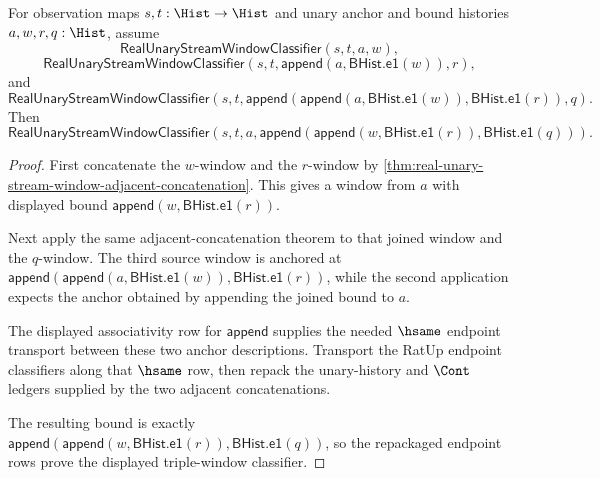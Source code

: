 \begin{theorem}
\label{thm:real-unary-window-associative-triple-concatenation}
For observation maps $s,t:\Hist\to\Hist$ and unary anchor and bound histories
$a,w,r,q:\Hist$, assume
$$
\mathsf{RealUnaryStreamWindowClassifier}(s,t,a,w),
$$
$$
\mathsf{RealUnaryStreamWindowClassifier}
(s,t,\mathsf{append}(a,\mathsf{BHist.e1}(w)),r),
$$
and
$$
\mathsf{RealUnaryStreamWindowClassifier}
(s,t,\mathsf{append}(\mathsf{append}(a,\mathsf{BHist.e1}(w)),
\mathsf{BHist.e1}(r)),q).
$$
Then
$$
\mathsf{RealUnaryStreamWindowClassifier}
(s,t,a,\mathsf{append}(\mathsf{append}(w,\mathsf{BHist.e1}(r)),
\mathsf{BHist.e1}(q))).
$$
\end{theorem}
\begin{proof}
First concatenate the $w$-window and the $r$-window by
\autoref{thm:real-unary-stream-window-adjacent-concatenation}. This gives a
window from $a$ with displayed bound
$\mathsf{append}(w,\mathsf{BHist.e1}(r))$.

Next apply the same adjacent-concatenation theorem to that joined window and
the $q$-window. The third source window is anchored at
$\mathsf{append}(\mathsf{append}(a,\mathsf{BHist.e1}(w)),
\mathsf{BHist.e1}(r))$, while the second application expects the anchor
obtained by appending the joined bound to $a$.

The displayed associativity row for $\mathsf{append}$ supplies the needed
$\hsame$ endpoint transport between these two anchor descriptions. Transport
the RatUp endpoint classifiers along that $\hsame$ row, then repack the
unary-history and $\Cont$ ledgers supplied by the two adjacent concatenations.

The resulting bound is exactly
$\mathsf{append}(\mathsf{append}(w,\mathsf{BHist.e1}(r)),
\mathsf{BHist.e1}(q))$, so the repackaged endpoint rows prove the displayed
triple-window classifier.
\end{proof}

